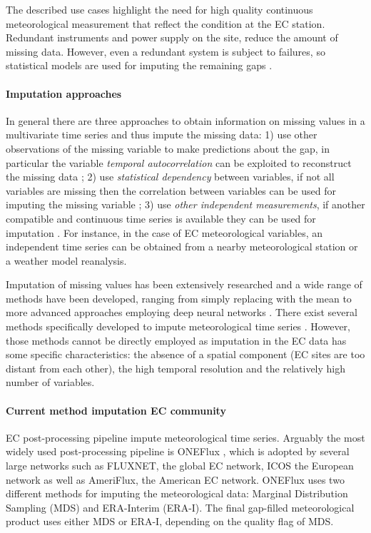\documentclass{article}
\begin{document}
The described use cases highlight the need for high quality continuous meteorological measurement that reflect the condition at the EC station. Redundant instruments and power supply on the site, reduce the amount of missing data. However, even a redundant system is subject to failures, so statistical models are used for imputing the remaining gaps \cite{aubinet_eddy_2012-1}.

\paragraph{Imputation approaches} In general there are three approaches to obtain information on missing values in a multivariate time series and thus impute the missing data: 1) use other observations of the missing variable to make predictions about the gap, in particular the variable \emph{temporal autocorrelation} can be exploited to reconstruct the missing data \cite{moritz_comparison_nodate}; 2) use \emph{statistical dependency} between variables, if not all variables are missing then the correlation between variables can be used for imputing the missing variable \cite{moffat_comprehensive_2007}; 3) use \emph{other independent measurements}, if another compatible and continuous time series is available they can be used for imputation \cite{vuichard_filling_2015}. For instance, in the case of EC meteorological variables, an independent time series can be obtained from a nearby meteorological station or a weather model reanalysis. 

Imputation of missing values has been extensively researched and a wide range of methods have been developed, ranging from simply replacing with the mean to more advanced approaches employing deep neural networks \cite{moritz_r_2017, fang_time_2020-1, buuren_mice_2011, du_saits_2022-1, zhang_dual-head_2021-2, cao_brits_nodate}. There exist several methods specifically developed to impute meteorological time series \cite{costa_gap_2021, jing_multi-imputation_2022}. However, those methods cannot be directly employed as imputation in the EC data has some specific characteristics: the absence of a spatial component (EC sites are too distant from each other), the high temporal resolution and the relatively high number of variables. 

\paragraph{Current method imputation EC community} EC post-processing pipeline impute meteorological time series. Arguably the most widely used post-processing pipeline is \textsf{ONEFlux} \cite{pastorello_fluxnet2015_2020}, which is adopted by several large networks such as FLUXNET, the global EC network, ICOS the European network as well as AmeriFlux, the American EC network.
\textsf{ONEFlux} uses two different methods for imputing the meteorological data: Marginal Distribution Sampling (MDS) and ERA-Interim (ERA-I). The final gap-filled meteorological product uses either MDS or ERA-I, depending on the quality flag of MDS.
\end{document}

